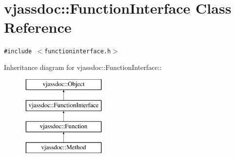 \hypertarget{classvjassdoc_1_1FunctionInterface}{
\section{vjassdoc::FunctionInterface Class Reference}
\label{classvjassdoc_1_1FunctionInterface}
}
{\tt \#include $<$functioninterface.h$>$}

Inheritance diagram for vjassdoc::FunctionInterface::\begin{figure}[H]
\begin{center}
\leavevmode
\includegraphics[height=4cm]{classvjassdoc_1_1FunctionInterface}
\end{center}
\end{figure}
